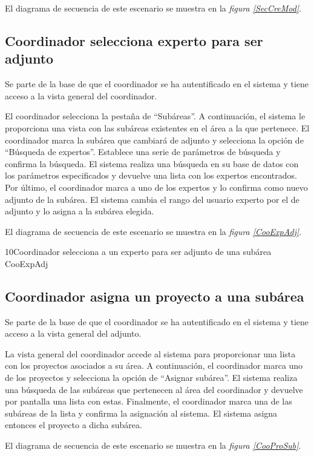 \documentclass[11pt,a4paper,spanish,twoside]{book}
\begin{document}
El diagrama de secuencia de este escenario se muestra en la \emph{figura
\ref{SecCreMod}}.


\subsection{Coordinador selecciona experto para ser adjunto}
Se parte de la base de que el coordinador se ha autentificado en el sistema y
tiene acceso a la vista general del coordinador.

El coordinador selecciona la pestaña de ``Subáreas''. A continuación, el
sistema le proporciona una vista con las subáreas existentes en el área a la
que pertenece. El coordinador marca la subárea que cambiará de adjunto y
selecciona la opción de ``Búsqueda de expertos''. Establece una serie de
parámetros de búsqueda y confirma la búsqueda. El sistema realiza una búsqueda
en su base de datos con los parámetros especificados y devuelve una lista
con los expertos encontrados. Por último, el coordinador marca a uno de los
expertos y lo confirma como nuevo adjunto de la subárea. El sistema cambia
el rango del usuario experto por el de adjunto y lo asigna a la subárea
elegida.

El diagrama de secuencia de este escenario se muestra en la \emph{figura
\ref{CooExpAdj}}.

{10}{Coordinador selecciona a un experto para ser adjunto de una subárea}
{CooExpAdj}

\subsection{Coordinador asigna un proyecto a una subárea}
Se parte de la base de que el coordinador se ha autentificado en el sistema y
tiene acceso a la vista general del adjunto.

La vista general del coordinador accede al sistema para proporcionar una
lista con los proyectos asociados a su área. A continuación, el coordinador
marca uno de los proyectos y selecciona la opción de ``Asignar subárea''. El
sistema realiza una búsqueda de las subáreas que pertenecen al área del
coordinador y devuelve por pantalla una lista con estas. Finalmente, el
coordinador marca una de las subáreas de la lista y confirma la asignación
al sistema. El sistema asigna entonces el proyecto a dicha subárea.

El diagrama de secuencia de este escenario se muestra en la \emph{figura
\ref{CooProSub}}.
\end{document}
